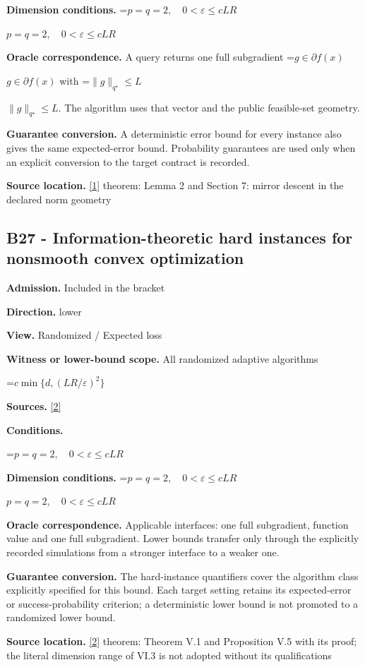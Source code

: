 \documentclass[10pt,a4paper]{article}
\newcommand{\AtlasMath}[1]{\par\begingroup\centering\setbox0=\hbox{$\displaystyle #1$}\ifdim\wd0>1.4\linewidth\typeout{ATLAS WIDE FORMULA: \the\wd0}\fi\ifdim\wd0>\linewidth\resizebox{\linewidth}{!}{\box0}\else\box0\fi\par\endgroup}
\newcommand{\AtlasInlineMath}[1]{\begingroup\setbox0=\hbox{$#1$}\ifdim\wd0>.4\linewidth\endgroup\AtlasMath{#1}\else\endgroup$#1$\fi}
\begin{document}
\textbf{Dimension conditions.} \AtlasInlineMath{p=q=2,\quad0<\varepsilon\le cLR}

\textbf{Oracle correspondence.} A query returns one full subgradient \AtlasInlineMath{g\in\partial f(x)} with \AtlasInlineMath{\|g\|_{q^\star}\le L}. The algorithm uses that vector and the public feasible-set geometry.

\textbf{Guarantee conversion.} A deterministic error bound for every instance also gives the same expected-error bound. Probability guarantees are used only when an explicit conversion to the target contract is recorded.

\textbf{Source location.} \href{https://arxiv.org/pdf/1107.4080}{[1]} theorem: Lemma 2 and Section 7: mirror descent in the declared norm geometry

\subsection{B27 - Information-theoretic hard instances for nonsmooth convex optimization}
\textbf{Admission.} Included in the bracket

\textbf{Direction.} lower

\textbf{View.} Randomized / Expected loss

\textbf{Witness or lower-bound scope.} All randomized adaptive algorithms

\AtlasMath{c\min\{d,(LR/\varepsilon)^2\}}
\textbf{Sources.} \href{https://arxiv.org/pdf/1407.5144}{[2]}

\textbf{Conditions.} 
\AtlasMath{p=q=2,\quad0<\varepsilon\le cLR}


\textbf{Dimension conditions.} \AtlasInlineMath{p=q=2,\quad0<\varepsilon\le cLR}

\textbf{Oracle correspondence.} Applicable interfaces: one full subgradient, function value and one full subgradient. Lower bounds transfer only through the explicitly recorded simulations from a stronger interface to a weaker one.

\textbf{Guarantee conversion.} The hard-instance quantifiers cover the algorithm class explicitly specified for this bound. Each target setting retains its expected-error or success-probability criterion; a deterministic lower bound is not promoted to a randomized lower bound.

\textbf{Source location.} \href{https://arxiv.org/pdf/1407.5144}{[2]} theorem: Theorem V.1 and Proposition V.5 with its proof; the literal dimension range of VI.3 is not adopted without its qualifications
\end{document}
